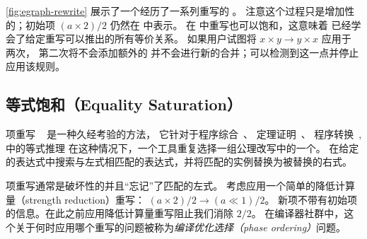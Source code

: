 \autoref{fig:egraph-rewrite} 展示了一个经历了一系列重写的 \egraph。
注意这个过程只是增加性的；初始项 $(a \times 2) / 2$ 仍然在 \egraph 中表示。
在 \egraph 中重写也可以饱和，这意味着 \egraph 已经学会了给定重写可以推出的所有等价关系。
如果用户试图将 $x \times y \to y \times x$ 应用于 \egraph 两次，
  第二次将不会添加额外的 \enodes 并不会进行新的合并；\egraph 可以检测到这一点并停止应用该规则。

\subsection{等式饱和（Equality Saturation）}
\label{sec:eqsat}

项重写 ~\cite{nachum-rewrites} 是一种久经考验的方法，
  它针对于程序综合~\cite{eqsat, denali}、
  定理证明~\cite{simplify, z3}、
  程序转换~\cite{graphs},
  中的等式推理
在这种情况下，一个工具重复选择一组公理改写中的一个。
  在给定的表达式中搜索与左式相匹配的表达式，并将匹配的实例替换为被替换的右式。

项重写通常是破坏性的并且“忘记”了匹配的左式。
考虑应用一个简单的降低计算量（strength reduction）重写：
  ${ (a \times 2) / 2 \to (a \ll 1) / 2 }$。
新项不带有初始项的信息。在此之前应用降低计算量重写阻止我们消除 $2/2$。
在编译器社群中，这个关于何时应用哪个重写的问题被称为\textit{编译优化选择（phase ordering）}问题。


